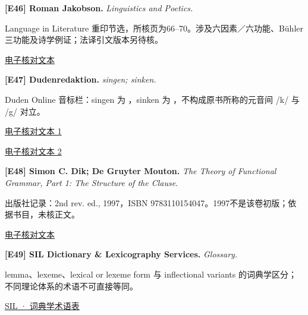 \par\noindent\begin{minipage}{\linewidth}
\label{ref-46}\noindent\textbf{[E46] Roman Jakobson.} \textit{Linguistics and Poetics.}\par\nobreak
Language in Literature 重印节选，所核页为66–70。涉及六因素／六功能、Bühler 三功能及诗学例证；法译引文版本另待核。\par
{\small\href{https://marul.ffst.hr/~bwillems/fymob/jakobsonfunctions.pdf}{电子核对文本}}\par
\par\end{minipage}\par

\par\noindent\begin{minipage}{\linewidth}
\label{ref-47}\noindent\textbf{[E47] Dudenredaktion.} \textit{singen; sinken.}\par\nobreak
Duden Online 音标栏：singen 为 \bipa{[ˈzɪŋən]}，sinken 为 \bipa{[ˈzɪŋkn̩]}，不构成原书所称的元音间 /k/ 与 /g/ 对立。\par
{\small\href{https://www.duden.de/rechtschreibung/singen}{电子核对文本 1}}\par
{\small\href{https://www.duden.de/rechtschreibung/sinken}{电子核对文本 2}}\par
\par\end{minipage}\par

\par\noindent\begin{minipage}{\linewidth}
\label{ref-48}\noindent\textbf{[E48] Simon C. Dik; De Gruyter Mouton.} \textit{The Theory of Functional Grammar, Part 1: The Structure of the Clause.}\par\nobreak
出版社记录：2nd rev. ed., 1997，ISBN 9783110154047。1997不是该卷初版；依据书目，未核正文。\par
{\small\href{https://www.degruyterbrill.com/document/doi/10.1515/9783110218367/html}{电子核对文本}}\par
\par\end{minipage}\par

\par\noindent\begin{minipage}{\linewidth}
\label{ref-49}\noindent\textbf{[E49] SIL Dictionary \& Lexicography Services.} \textit{Glossary.}\par\nobreak
lemma、lexeme、lexical or lexeme form 与 inflectional variants 的词典学区分；不同理论体系的术语不可直接等同。\par
{\small\href{https://sites.google.com/sil.org/dls-course/resources/glossary}{SIL · 词典学术语表}}\par
\par\end{minipage}\par

